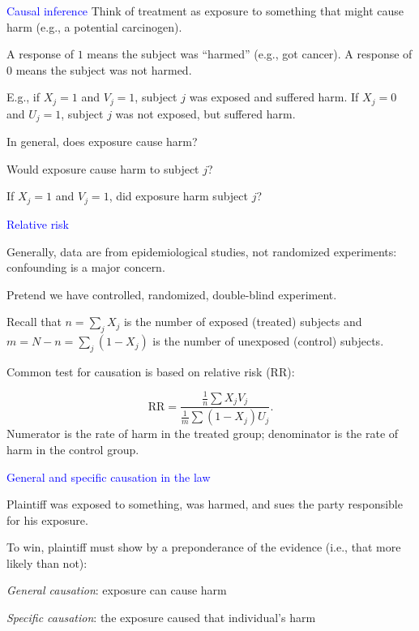 \documentclass[landscape]{slides}
\newcommand{\RR}{{\mbox{RR}}}
\newcommand{\beq}{\begin{equation}}
\newcommand{\eeq}{\end{equation}}
\begin{document}
\begin{slide}
\begin{slide}{\textcolor{blue}{Causal inference}}
Think of treatment as exposure to something that might cause harm
(e.g., a potential carcinogen).

A response of $1$ means the subject was ``harmed'' (e.g., got cancer). 
A response of $0$ means the subject was not harmed.

E.g., if $X_j = 1$ and $V_j = 1$, subject $j$ was exposed and suffered harm.
If $X_j = 0$ and $U_j = 1$, subject $j$ was not exposed, but suffered harm.

In general, does exposure cause harm?  

Would exposure cause harm to subject $j$?

If $X_j = 1$ and $V_j = 1$, did exposure harm subject $j$?

\end{slide}

\begin{slide}{\textcolor{blue}{Relative risk}}

Generally, data are from epidemiological studies, not randomized experiments:
confounding is a major concern.

Pretend we have controlled, randomized, double-blind experiment.

Recall that $n = \sum_j X_j$ is the number of exposed (treated) subjects and
$m = N-n = \sum_j (1-X_j)$ is the number of unexposed (control) subjects.

Common test for causation is based on relative risk (RR):

\beq
    \RR = \frac{\frac{1}{n} \sum X_j V_j}{\frac{1}{m} \sum (1-X_j) U_j}.
\eeq
Numerator is the rate of harm in the treated group; denominator is the rate of
harm in the control group.

\end{slide}

\begin{slide}{\textcolor{blue}{General and specific causation in the law}}

Plaintiff was exposed to something, was harmed, and sues the party responsible for
his exposure.  

To win, plaintiff must show by a preponderance of the evidence (i.e., that more likely than not):

{\em General causation\/}:  exposure can cause harm

{\em Specific causation\/}:  the exposure caused that individual's harm


\end{slide}
\end{slide}
\end{document}
